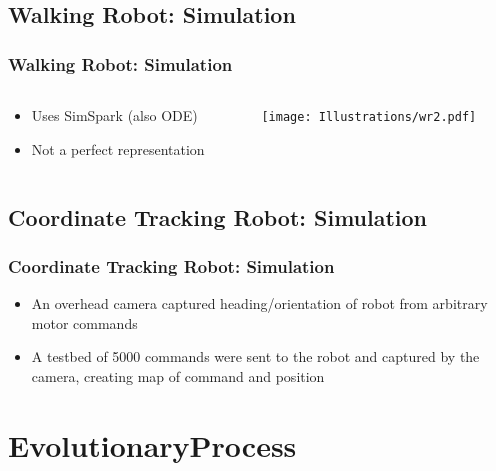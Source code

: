 \documentclass{beamer}
\begin{document}
\subsection{Walking Robot: Simulation}
\begin{frame}
  \frametitle{Walking Robot: Simulation}
\begin{columns}
  \begin{column}{0.5\textwidth}
\begin{itemize}
\item  Uses SimSpark (also ODE)
\item  Not a perfect representation
\end{itemize}
\end{column}
\begin{column}{0.5\textwidth}
 \texttt{[image: Illustrations/wr2.pdf]}
       \\
\end{column}
\end{columns}
\end{frame}

\subsection{Coordinate Tracking Robot: Simulation}
\begin{frame}
  \frametitle{Coordinate Tracking Robot: Simulation}
\begin{itemize}
\item An overhead camera captured heading/orientation of robot from arbitrary motor commands
\item A testbed of 5000 commands were sent to the robot and captured by the camera, creating map of command and position
\end{itemize}
\end{frame}

\section{EvolutionaryProcess}
\end{document}
